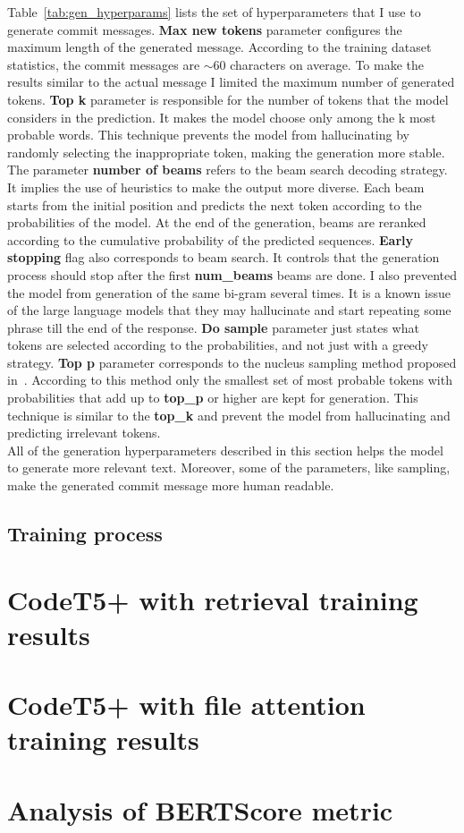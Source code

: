 Table~\ref{tab:gen_hyperparams} lists the set of hyperparameters that I use to generate commit messages. \textbf{Max new tokens} parameter configures the maximum length of the generated message. According to the training dataset statistics, the commit messages are $\sim60$ characters on average. To make the results similar to the actual message I limited the maximum number of generated tokens. \textbf{Top k} parameter is responsible for the number of tokens that the model considers in the prediction. It makes the model choose only among the k most probable words. This technique prevents the model from hallucinating by randomly selecting the inappropriate token, making the generation more stable. The parameter \textbf{ number of beams} refers to the beam search decoding strategy. It implies the use of heuristics to make the output more diverse. Each beam starts from the initial position and predicts the next token according to the probabilities of the model. At the end of the generation, beams are reranked according to the cumulative probability of the predicted sequences. \textbf{Early stopping} flag also corresponds to beam search. It controls that the generation process should stop after the first \textbf{num\_beams} beams are done. 
I also prevented the model from generation of the same bi-gram several times. It is a known issue of the large language models that they may hallucinate and start repeating some phrase till the end of the response. 
\textbf{Do sample} parameter just states what tokens are selected according to the probabilities, and not just with a greedy strategy.
\textbf{Top p} parameter corresponds to the nucleus sampling method proposed in~\cite{holtzman2019curious}. According to this method only the smallest set of most probable tokens with probabilities that add up to \textbf{top\_p} or higher are kept for generation. This technique is similar to the \textbf{top\_k} and prevent the model from hallucinating and predicting irrelevant tokens.  \\ 
All of the generation hyperparameters described in this section helps the model to generate more relevant text. Moreover, some of the parameters, like sampling, make the generated commit message more human readable. 

\subsection{Training process}

\section{CodeT5+ with retrieval training results}

\section{CodeT5+ with file attention training results}

\section{Analysis of BERTScore metric}
